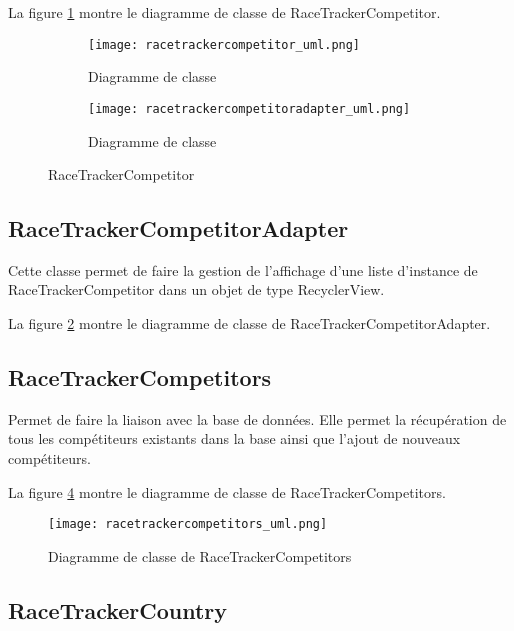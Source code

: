 La figure \ref{fig:racetrackercompetitor_uml} montre le diagramme de classe de RaceTrackerCompetitor.

\begin{figure}[htb!]
    \centering
    \begin{subfigure}[htb]{1\textwidth}
		\texttt{[image: racetrackercompetitor\_uml.png]} 
		\caption{Diagramme de classe}
		\label{fig:racetrackercompetitor_uml}
    \end{subfigure}
    \begin{subfigure}[htb]{1\textwidth}
		\texttt{[image: racetrackercompetitoradapter\_uml.png]} 
		\caption{Diagramme de classe}
		\label{fig:racetrackercompetitoradapter_uml}
    \end{subfigure}
    \caption{RaceTrackerCompetitor}\label{fig:racetrackercompetitor_fig}
\end{figure}

\subsection{RaceTrackerCompetitorAdapter}

Cette classe permet de faire la gestion de l'affichage d'une liste d'instance de RaceTrackerCompetitor dans un objet de type RecyclerView.

La figure \ref{fig:racetrackercompetitoradapter_uml} montre le diagramme de classe de RaceTrackerCompetitorAdapter.

\subsection{RaceTrackerCompetitors}

Permet de faire la liaison avec la base de données. Elle permet la récupération de tous les compétiteurs existants dans la base ainsi que l'ajout de nouveaux compétiteurs.

La figure \ref{fig:racetrackercompetitors_uml} montre le diagramme de classe de RaceTrackerCompetitors.

\begin{figure}[htb]
\centering 
\texttt{[image: racetrackercompetitors\_uml.png]} 
\caption{Diagramme de classe de RaceTrackerCompetitors}
\label{fig:racetrackercompetitors_uml}
 \end{figure}

\subsection{RaceTrackerCountry}

